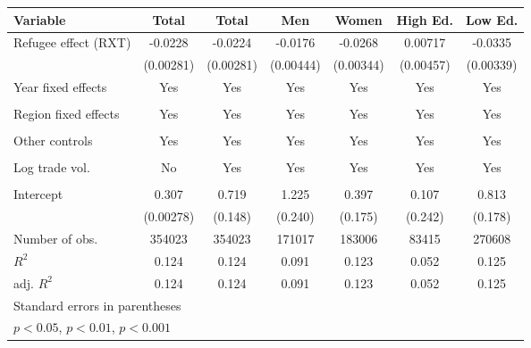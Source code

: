 \documentclass{article}
\begin{document}
{\begin{tabular}{l*{6}{c}}
\hline\hline
Variable
            &\multicolumn{1}{c}{Total}&\multicolumn{1}{c}{Total}&\multicolumn{1}{c}{Men}&\multicolumn{1}{c}{Women}&\multicolumn{1}{c}{High Ed.}&\multicolumn{1}{c}{Low Ed.}\\
\hline
Refugee effect (RXT)        &     -0.0228\sym{***}&     -0.0224\sym{***}&     -0.0176\sym{***}&     -0.0268\sym{***}&     0.00717         &     -0.0335\sym{***}\\
            &   (0.00281)         &   (0.00281)         &   (0.00444)         &   (0.00344)         &   (0.00457)         &   (0.00339)         \\
[1em]
Year fixed effects         &       Yes&       Yes&                     Yes&                     Yes&      Yes&       Yes\\
            &            &            &                     &                     &            &           \\
[1em]
Region fixed effects     &     Yes&      Yes&      Yes&     Yes &     Yes&      Yes\\
            &            &            &           &            &          &            \\
[1em]
Other controls       &      Yes&      Yes&      Yes&      Yes&      Yes&     Yes\\
            &           &           &         &           &           &           \\
[1em]
Log trade vol.   &                    No &     Yes &     Yes&   Yes         &   Yes        &     Yes \\
            &                     &            &           &           &            &           \\
[1em]
Intercept     &       0.307\sym{***}&       0.719\sym{***}&       1.225\sym{***}&       0.397\sym{*}  &       0.107         &       0.813\sym{***}\\
            &   (0.00278)         &     (0.148)         &     (0.240)         &     (0.175)         &     (0.242)         &     (0.178)         \\
\hline
Number of obs.       &      354023         &      354023         &      171017         &      183006         &       83415         &      270608         \\
\(R^{2}\)   &       0.124         &       0.124         &       0.091         &       0.123         &       0.052         &       0.125         \\
adj. \(R^{2}\)&       0.124         &       0.124         &       0.091         &       0.123         &       0.052         &       0.125         \\
\hline\hline
\multicolumn{7}{l}{\footnotesize Standard errors in parentheses}\\
\multicolumn{7}{l}{\footnotesize \sym{*} \(p<0.05\), \sym{**} \(p<0.01\), \sym{***} \(p<0.001\)}\\
\end{tabular}
}
\end{document}
